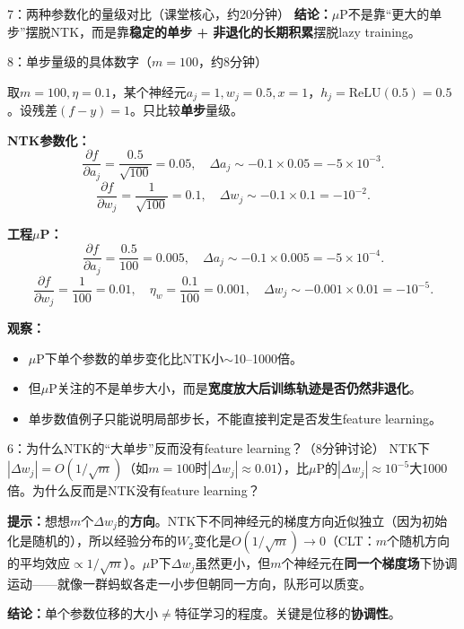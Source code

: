 \documentclass[11pt,a4paper]{article}
\begin{document}
\begin{handcalc}{7：两种参数化的量级对比（课堂核心，约20分钟）}
\textbf{结论：}$\mu$P不是靠``更大的单步''摆脱NTK，而是靠\textbf{稳定的单步 + 非退化的长期积累}摆脱lazy training。
\end{handcalc}

\begin{handcalc}{8：单步量级的具体数字（$m=100$，约8分钟）}

取$m=100, \eta=0.1$，某个神经元$a_j=1, w_j=0.5, x=1$，$h_j=\text{ReLU}(0.5)=0.5$。设残差$(f-y)=1$。只比较\textbf{单步}量级。

\tcblower

\textbf{NTK参数化：}
\[
\frac{\partial f}{\partial a_j} = \frac{0.5}{\sqrt{100}}=0.05, \quad \Delta a_j \sim -0.1\times 0.05 = -5\times 10^{-3}.
\]
\[
\frac{\partial f}{\partial w_j} = \frac{1}{\sqrt{100}}=0.1, \quad \Delta w_j \sim -0.1\times 0.1 = -10^{-2}.
\]

\textbf{工程$\mu$P：}
\[
\frac{\partial f}{\partial a_j} = \frac{0.5}{100}=0.005, \quad \Delta a_j \sim -0.1\times 0.005 = -5\times 10^{-4}.
\]
\[
\frac{\partial f}{\partial w_j} = \frac{1}{100}=0.01, \quad \eta_w=\frac{0.1}{100}=0.001, \quad \Delta w_j \sim -0.001\times 0.01 = -10^{-5}.
\]

\textbf{观察：}
\begin{itemize}[leftmargin=*]
\item $\mu$P下单个参数的单步变化比NTK小$\sim$10--1000倍。
\item 但$\mu$P关注的不是单步大小，而是\textbf{宽度放大后训练轨迹是否仍然非退化}。
\item 单步数值例子只能说明局部步长，不能直接判定是否发生feature learning。
\end{itemize}
\end{handcalc}

\begin{classexercise}{6：为什么NTK的``大单步''反而没有feature learning？（8分钟讨论）}
NTK下$|\Delta w_j|=O(1/\sqrt{m})$（如$m=100$时$|\Delta w_j|\approx 0.01$），比$\mu$P的$|\Delta w_j|\approx 10^{-5}$大1000倍。为什么反而是NTK没有feature learning？

\textbf{提示：}想想$m$个$\Delta w_j$的\textbf{方向}。NTK下不同神经元的梯度方向近似独立（因为初始化是随机的），所以经验分布的$W_2$变化是$O(1/\sqrt{m})\to 0$（CLT：$m$个随机方向的平均效应$\propto 1/\sqrt{m}$）。$\mu$P下$\Delta w_j$虽然更小，但$m$个神经元在\textbf{同一个梯度场}下协调运动——就像一群蚂蚁各走一小步但朝同一方向，队形可以质变。

\textbf{结论：}单个参数位移的大小$\neq$特征学习的程度。关键是位移的\textbf{协调性}。
\end{classexercise}
\end{document}
